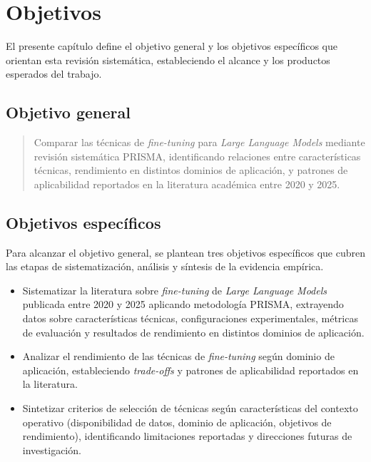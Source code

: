 \chapter{Objetivos}

El presente capítulo define el objetivo general y los objetivos específicos que orientan esta revisión sistemática, estableciendo el alcance y los productos esperados del trabajo.

\section{Objetivo general}
\begin{quote}
Comparar las técnicas de \textit{fine-tuning} para \textit{Large Language Models} mediante revisión sistemática PRISMA, identificando relaciones entre características técnicas, rendimiento en distintos dominios de aplicación, y patrones de aplicabilidad reportados en la literatura académica entre 2020 y 2025.
\end{quote}

\section{Objetivos específicos}

Para alcanzar el objetivo general, se plantean tres objetivos específicos que cubren las etapas de sistematización, análisis y síntesis de la evidencia empírica.

\begin{itemize}
    \item Sistematizar la literatura sobre \textit{fine-tuning} de \textit{Large Language Models} publicada entre 2020 y 2025 aplicando metodología PRISMA, extrayendo datos sobre características técnicas, configuraciones experimentales, métricas de evaluación y resultados de rendimiento en distintos dominios de aplicación.

    \item Analizar el rendimiento de las técnicas de \textit{fine-tuning} según dominio de aplicación, estableciendo \textit{trade-offs} y patrones de aplicabilidad reportados en la literatura.

    \item Sintetizar criterios de selección de técnicas según características del contexto operativo (disponibilidad de datos, dominio de aplicación, objetivos de rendimiento), identificando limitaciones reportadas y direcciones futuras de investigación.
\end{itemize}